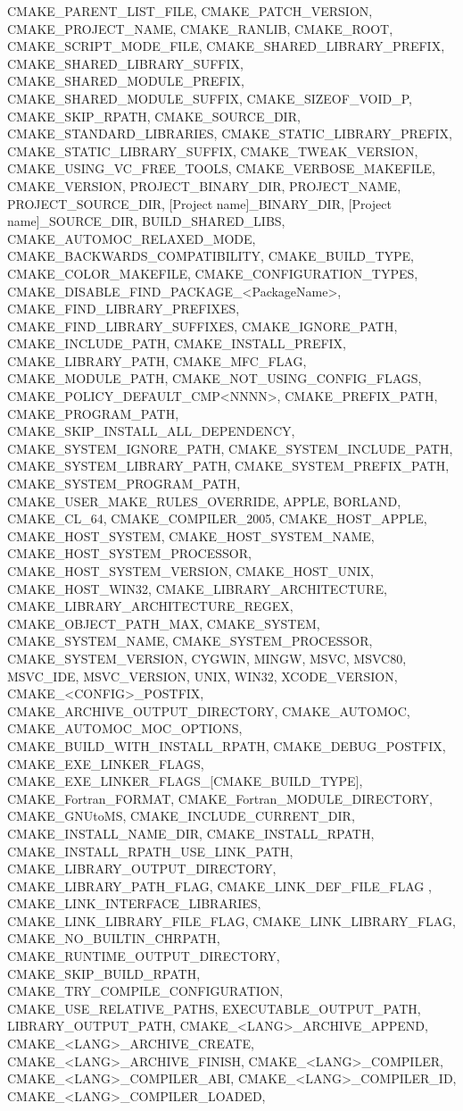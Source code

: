 {{CMAKE_PARENT_LIST_FILE,
CMAKE_PATCH_VERSION,
CMAKE_PROJECT_NAME,
CMAKE_RANLIB,
CMAKE_ROOT,
CMAKE_SCRIPT_MODE_FILE,
CMAKE_SHARED_LIBRARY_PREFIX,
CMAKE_SHARED_LIBRARY_SUFFIX,
CMAKE_SHARED_MODULE_PREFIX,
CMAKE_SHARED_MODULE_SUFFIX,
CMAKE_SIZEOF_VOID_P,
CMAKE_SKIP_RPATH,
CMAKE_SOURCE_DIR,
CMAKE_STANDARD_LIBRARIES,
CMAKE_STATIC_LIBRARY_PREFIX,
CMAKE_STATIC_LIBRARY_SUFFIX,
CMAKE_TWEAK_VERSION,
CMAKE_USING_VC_FREE_TOOLS,
CMAKE_VERBOSE_MAKEFILE,
CMAKE_VERSION,
PROJECT_BINARY_DIR,
PROJECT_NAME,
PROJECT_SOURCE_DIR,
[Project name]_BINARY_DIR,
[Project name]_SOURCE_DIR,
BUILD_SHARED_LIBS,
CMAKE_AUTOMOC_RELAXED_MODE,
CMAKE_BACKWARDS_COMPATIBILITY,
CMAKE_BUILD_TYPE,
CMAKE_COLOR_MAKEFILE,
CMAKE_CONFIGURATION_TYPES,
CMAKE_DISABLE_FIND_PACKAGE_<PackageName>,
CMAKE_FIND_LIBRARY_PREFIXES,
CMAKE_FIND_LIBRARY_SUFFIXES,
CMAKE_IGNORE_PATH,
CMAKE_INCLUDE_PATH,
CMAKE_INSTALL_PREFIX,
CMAKE_LIBRARY_PATH,
CMAKE_MFC_FLAG,
CMAKE_MODULE_PATH,
CMAKE_NOT_USING_CONFIG_FLAGS,
CMAKE_POLICY_DEFAULT_CMP<NNNN>,
CMAKE_PREFIX_PATH,
CMAKE_PROGRAM_PATH,
CMAKE_SKIP_INSTALL_ALL_DEPENDENCY,
CMAKE_SYSTEM_IGNORE_PATH,
CMAKE_SYSTEM_INCLUDE_PATH,
CMAKE_SYSTEM_LIBRARY_PATH,
CMAKE_SYSTEM_PREFIX_PATH,
CMAKE_SYSTEM_PROGRAM_PATH,
CMAKE_USER_MAKE_RULES_OVERRIDE,
APPLE,
BORLAND,
CMAKE_CL_64,
CMAKE_COMPILER_2005,
CMAKE_HOST_APPLE,
CMAKE_HOST_SYSTEM,
CMAKE_HOST_SYSTEM_NAME,
CMAKE_HOST_SYSTEM_PROCESSOR,
CMAKE_HOST_SYSTEM_VERSION,
CMAKE_HOST_UNIX,
CMAKE_HOST_WIN32,
CMAKE_LIBRARY_ARCHITECTURE,
CMAKE_LIBRARY_ARCHITECTURE_REGEX,
CMAKE_OBJECT_PATH_MAX,
CMAKE_SYSTEM,
CMAKE_SYSTEM_NAME,
CMAKE_SYSTEM_PROCESSOR,
CMAKE_SYSTEM_VERSION,
CYGWIN,
MINGW,
MSVC,
MSVC80,
MSVC_IDE,
MSVC_VERSION,
UNIX,
WIN32,
XCODE_VERSION,
CMAKE_<CONFIG>_POSTFIX,
CMAKE_ARCHIVE_OUTPUT_DIRECTORY,
CMAKE_AUTOMOC,
CMAKE_AUTOMOC_MOC_OPTIONS,
CMAKE_BUILD_WITH_INSTALL_RPATH,
CMAKE_DEBUG_POSTFIX,
CMAKE_EXE_LINKER_FLAGS,
CMAKE_EXE_LINKER_FLAGS_[CMAKE_BUILD_TYPE],
CMAKE_Fortran_FORMAT,
CMAKE_Fortran_MODULE_DIRECTORY,
CMAKE_GNUtoMS,
CMAKE_INCLUDE_CURRENT_DIR,
CMAKE_INSTALL_NAME_DIR,
CMAKE_INSTALL_RPATH,
CMAKE_INSTALL_RPATH_USE_LINK_PATH,
CMAKE_LIBRARY_OUTPUT_DIRECTORY,
CMAKE_LIBRARY_PATH_FLAG,
CMAKE_LINK_DEF_FILE_FLAG  ,
CMAKE_LINK_INTERFACE_LIBRARIES,
CMAKE_LINK_LIBRARY_FILE_FLAG,
CMAKE_LINK_LIBRARY_FLAG,
CMAKE_NO_BUILTIN_CHRPATH,
CMAKE_RUNTIME_OUTPUT_DIRECTORY,
CMAKE_SKIP_BUILD_RPATH,
CMAKE_TRY_COMPILE_CONFIGURATION,
CMAKE_USE_RELATIVE_PATHS,
EXECUTABLE_OUTPUT_PATH,
LIBRARY_OUTPUT_PATH,
CMAKE_<LANG>_ARCHIVE_APPEND,
CMAKE_<LANG>_ARCHIVE_CREATE,
CMAKE_<LANG>_ARCHIVE_FINISH,
CMAKE_<LANG>_COMPILER,
CMAKE_<LANG>_COMPILER_ABI,
CMAKE_<LANG>_COMPILER_ID,
CMAKE_<LANG>_COMPILER_LOADED,
}}

